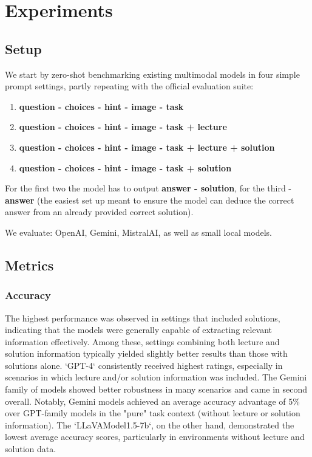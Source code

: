 \documentclass{article}
\begin{document}
\section{Experiments}
\label{experiments}

\subsection{Setup}
We start by zero-shot benchmarking existing multimodal models in four simple prompt settings, partly repeating with the official evaluation suite:
\begin{enumerate}
	\item \textbf{question - choices - hint - image - task}
	\item \textbf{question - choices - hint - image - task + lecture}
	\item \textbf{question - choices - hint - image - task + lecture + solution}
	\item \textbf{question - choices - hint - image - task + solution}
\end{enumerate}

For the first two the model has to output \textbf{answer - solution}, for the third - \textbf{answer} (the easiest set up meant to ensure the model can deduce the correct answer from an already provided correct solution). 

We evaluate: OpenAI, Gemini, MistralAI, as well as small local models. %

\subsection{Metrics}
\subsubsection{Accuracy}
The highest performance was observed in settings that included solutions, indicating that the models were generally capable of extracting relevant information effectively. Among these, settings combining both lecture and solution information typically yielded slightly better results than those with solutions alone. `GPT-4` consistently received highest ratings, especially in scenarios in which lecture and/or solution information was included. The Gemini family of models showed better robustness in many scenarios and came in second overall. Notably, Gemini models achieved an average accuracy advantage of 5\% over GPT-family models in the "pure" task context (without lecture or solution information). The `LLaVAModel1.5-7b`, on the other hand, demonstrated the lowest average accuracy scores, particularly in environments without lecture and solution data.
\end{document}

